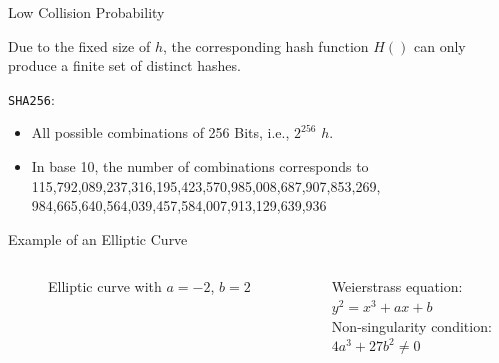 \documentclass[handout]{beamer}
\begin{document}
\begin{frame}{Low Collision Probability}

Due to the fixed size of $h$, the corresponding hash function $H()$ can only produce a finite set of distinct hashes.
\vspace{1em}

\texttt{SHA256}:
	\begin{itemize}
		\item All possible combinations of 256 Bits, i.e., $2^{256}$ $h$.
		\item In base 10, the number of combinations corresponds to 115,792,089,237,316,195,423,570,985,008,687,907,853,269,\\984,665,640,564,039,457,584,007,913,129,639,936
	\end{itemize}
\vspace{1em}

	
\end{frame}

\begin{frame}{Example of an Elliptic Curve}

	\begin{columns}
		\begin{column}{0.5\textwidth}
			\begin{figure}
			
				\caption*{Elliptic curve with $a = -2$, $b = 2$}
			\end{figure}	
		\end{column}
		\begin{column}{0.5\textwidth}
			Weierstrass equation:\\
			\vspace{1em}
			$y^2 = x^3 + ax + b$\\
			\vspace{2em}
			Non-singularity condition:\\
			\vspace{1em}
			$4a^3 + 27b^2 \neq 0$
		\end{column}
	\end{columns}
	
\end{frame}
\end{document}
